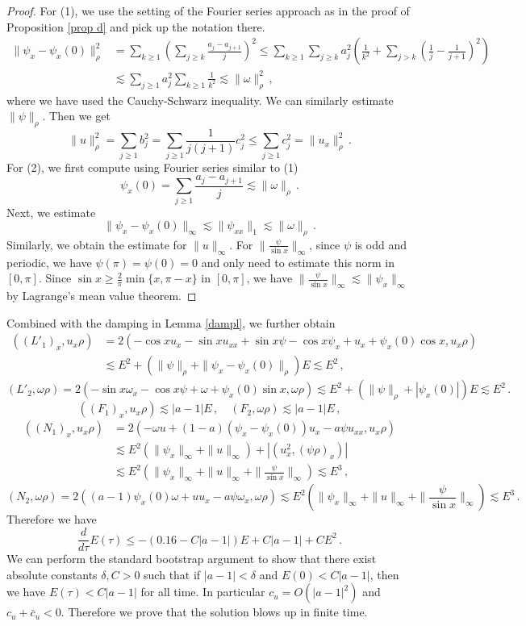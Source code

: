 \documentclass[12pt]{caltech_thesis}
\numberwithin{equation}{section}
\begin{document}
\begin{proof}
    For (1), we use the setting of the Fourier series approach as in the proof of Proposition \ref{prop d} and pick up the notation there.
    $$\begin{aligned}
    \|\psi_x-\psi_x(0)\|_{\rho}^2&=\sum_{k \geq 1} (\sum_{j\geq k}\frac{a_j-a_{j+1}}{j})^2\leq\sum_{k \geq 1} \sum_{j\geq k}a^2_j(\frac{1}{k^2}+\sum_{j>k}(\frac{1}{j}-\frac{1}{j+1})^2)\\&\lesssim\sum_{j \geq 1} a_j^2\sum_{k \geq 1} \frac{1}{k^2}\lesssim\|\omega\|_{\rho}^2\,,\end{aligned}$$
    where we have used the Cauchy-Schwarz inequality. We can similarly estimate $\|\psi\|_{\rho}$. Then we get
    $$\|u\|_{\rho}^2=\sum_{j \geq 1} b_j^2=\sum_{j \geq 1} \frac{1}{j(j+1)}c_j^2\leq\sum_{j \geq 1} c_j^2=\|u_x\|_{\rho}^2\,.$$
    For (2), we first compute using Fourier series similar to (1) $$\psi_x(0)=\sum_{j \geq 1}\frac{a_j-a_{j+1}}{j}\lesssim\|\omega\|_{\rho}\,.$$
    Next, we estimate $$\|\psi_x-\psi_x(0)\|_{\infty}\lesssim\|\psi_{xx}\|_{1}\lesssim\|\omega\|_{\rho}\,.$$
Similarly, we obtain the estimate for $\|u\|_{\infty}$.
    For $\|\frac{\psi}{\sin x}\|_{\infty}$, since $\psi$ is odd and periodic, we have $\psi(\pi)=\psi(0)=0$ and only need to estimate this norm in $[0,\pi]$. Since $\sin x\geq \frac{2}{\pi}\min\{x,\pi-x\}$ in $[0,\pi]$,
    we have $\|\frac{\psi}{\sin x}\|_{\infty}\lesssim\|\psi_x\|_{\infty}$ by Lagrange's mean value theorem.
\end{proof}
Combined with the damping in Lemma \ref{dampl}, we further obtain 
$$\begin{aligned}((L'_1)_x,u_x\rho)&=2(-\cos xu_x-\sin xu_{xx}+\sin x\psi-\cos x\psi_x+u_x+\psi_x(0)\cos x,u_x\rho)\\&\lesssim E^2+(\|\psi\|_{\rho}+\|\psi_x-\psi_x(0)\|_{\rho})E\lesssim E^2\,,\end{aligned}$$
$$(L'_2,\omega\rho)=2(-\sin x\omega_x-\cos x\psi+\omega+\psi_x(0)\sin x,\omega\rho)\lesssim E^2+(\|\psi\|_{\rho}+|\psi_x(0)|)E\lesssim E^2\,.$$
$$((F_1)_x,u_x\rho)\lesssim |a-1|E\,,\quad(F_2,\omega\rho)\lesssim |a-1|E\,,$$
$$\begin{aligned}((N_1)_x,u_x\rho)&=2(-\omega u+(1-a)(\psi_x-\psi_x(0))u_{x}-a\psi u_{xx},u_x\rho)\\&\lesssim E^2(\|\psi_x\|_{\infty}+\|u\|_{\infty})+|(u_x^2,(\psi\rho)_x)|\\&\lesssim E^2(\|\psi_x\|_{\infty}+\|u\|_{\infty}+\|\frac{\psi}{\sin x}\|_{\infty})\lesssim E^3\,,\end{aligned}$$
$$(N_2,\omega\rho)=2((a-1)\psi_x(0)\omega+uu_x-a\psi\omega_x,\omega\rho)\lesssim E^2(\|\psi_x\|_{\infty}+\|u\|_{\infty}+\|\frac{\psi}{\sin x}\|_{\infty})\lesssim E^3\,.$$
Therefore we have \begin{equation}
\label{nonl-collected}
    \frac{d}{d\tau}E(\tau)\leq -(0.16-C|a-1|)E+C|a-1|+CE^2\,.
\end{equation}
We can perform the standard bootstrap argument to show that there exist absolute constants $\delta,C>0$ such that if $|a-1|<\delta$ and $E(0)<C|a-1|$, then we have $E(\tau)<C|a-1|$ for all time. In particular $c_u=O(|a-1|^2)$ and $c_u+\bar{c}_u<0$. Therefore we prove that the solution blows up in finite time.
\end{document}
